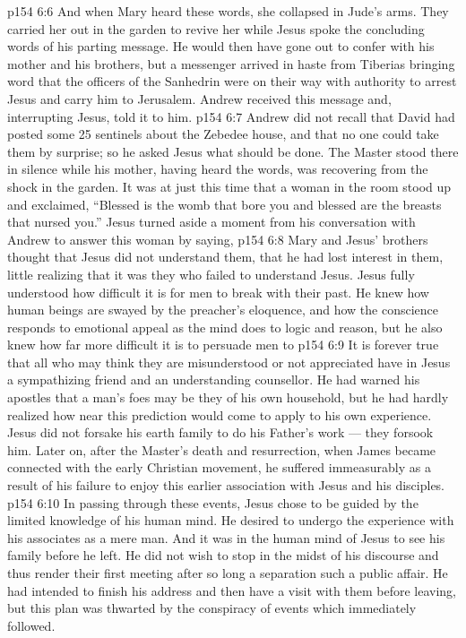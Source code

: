 \vs p154 6:6 And when Mary heard these words, she collapsed in Jude’s arms. They carried her out in the garden to revive her while Jesus spoke the concluding words of his parting message. He would then have gone out to confer with his mother and his brothers, but a messenger arrived in haste from Tiberias bringing word that the officers of the Sanhedrin were on their way with authority to arrest Jesus and carry him to Jerusalem. Andrew received this message and, interrupting Jesus, told it to him.
\vs p154 6:7 Andrew did not recall that David had posted some 25 sentinels about the Zebedee house, and that no one could take them by surprise; so he asked Jesus what should be done. The Master stood there in silence while his mother, having heard the words,  was recovering from the shock in the garden. It was at just this time that a woman in the room stood up and exclaimed, “Blessed is the womb that bore you and blessed are the breasts that nursed you.” Jesus turned aside a moment from his conversation with Andrew to answer this woman by saying, 
\vs p154 6:8 \pc Mary and Jesus’ brothers thought that Jesus did not understand them, that he had lost interest in them, little realizing that it was they who failed to understand Jesus. Jesus fully understood how difficult it is for men to break with their past. He knew how human beings are swayed by the preacher’s eloquence, and how the conscience responds to emotional appeal as the mind does to logic and reason, but he also knew how far more difficult it is to persuade men to 
\vs p154 6:9 It is forever true that all who may think they are misunderstood or not appreciated have in Jesus a sympathizing friend and an understanding counsellor. He had warned his apostles that a man’s foes may be they of his own household, but he had hardly realized how near this prediction would come to apply to his own experience. Jesus did not forsake his earth family to do his Father’s work --- they forsook him. Later on, after the Master’s death and resurrection, when James became connected with the early Christian movement, he suffered immeasurably as a result of his failure to enjoy this earlier association with Jesus and his disciples.
\vs p154 6:10 \pc In passing through these events, Jesus chose to be guided by the limited knowledge of his human mind. He desired to undergo the experience with his associates as a mere man. And it was in the human mind of Jesus to see his family before he left. He did not wish to stop in the midst of his discourse and thus render their first meeting after so long a separation such a public affair. He had intended to finish his address and then have a visit with them before leaving, but this plan was thwarted by the conspiracy of events which immediately followed.
